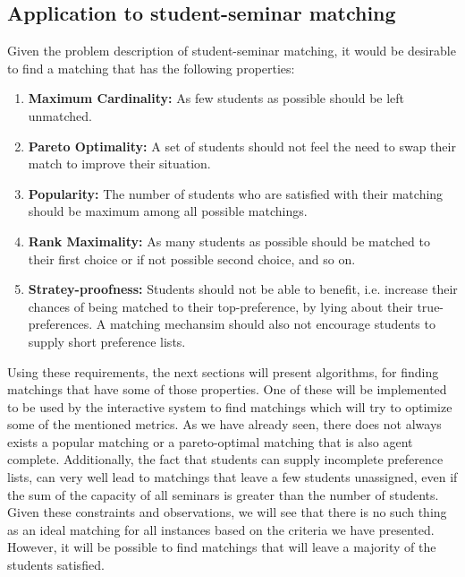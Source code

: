 \subsection{Application to student-seminar matching}\label{criteria-application}
Given the problem description of student-seminar matching, it would be desirable to find a matching that has the following properties:
\begin{enumerate}
    \item \textbf{Maximum Cardinality:} As few students as possible should be left unmatched.
    \item \textbf{Pareto Optimality:} A set of students should not feel the need to swap their match to improve their situation.
    \item \textbf{Popularity:} The number of students who are satisfied with their matching should be maximum among all possible matchings.
    \item \textbf{Rank Maximality:} As many students as possible should be matched to their first choice or if not possible second choice, and so on.
    \item \textbf{Stratey-proofness:} Students should not be able to benefit, i.e. increase their chances of being matched to their top-preference, by lying about their true-preferences. A matching mechansim should also not encourage students to supply short preference lists.
\end{enumerate}
Using these requirements, the next sections will present algorithms, for finding matchings that have some of those properties. One of these will be implemented to be used by the interactive system to find matchings which will try to optimize some of the mentioned metrics. As we have already seen, there does not always exists a popular matching or a pareto-optimal matching that is also agent complete. Additionally, the fact that students can supply incomplete preference lists, can very well lead to matchings that leave a few students unassigned, even if the sum of the capacity of all seminars is greater than the number of students. Given these constraints and observations, we will see that there is no such thing as an ideal matching for all instances based on the criteria we have presented. However, it will be possible to find matchings that will leave a majority of the students satisfied.